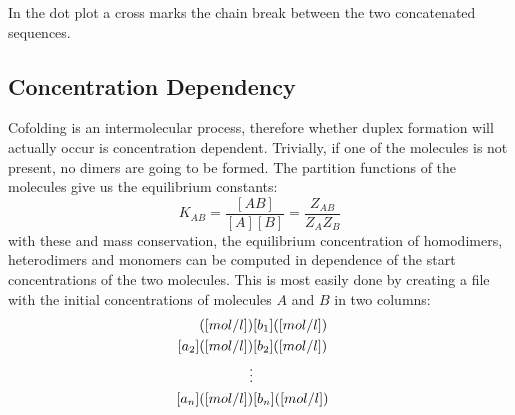 \documentclass[a4paper]{article}
\begin{document}
In the dot plot a cross marks the chain break between the two concatenated sequences.

\subsection{Concentration Dependency}
 Cofolding is an intermolecular process, therefore whether
 duplex formation will actually occur is concentration dependent.
 Trivially, if one of the molecules is not present, no dimers are going to
 be formed. The partition functions of the molecules give us the
 equilibrium constants:
 \begin{equation*}
   K_{AB} = \frac{[AB]}{[A][B]} = \frac{Z_{AB}}{Z_AZ_B}
 \end{equation*}
 with these and mass conservation, the equilibrium concentration of
 homodimers, heterodimers and monomers can be computed in dependence
 of the start concentrations of the two molecules.
 This is most easily done by creating a file with the
 initial concentrations of molecules $A$ and $B$ in two columns:\\
 \begin{eqnarray*}
   [a_1]([mol/l])  & [b_1]([mol/l])\cr
   [a_2]([mol/l])  & [b_2]([mol/l])\cr
       \vdots & \cr
   [a_n]([mol/l])  & [b_n]([mol/l])
 \end{eqnarray*}
\end{document}
